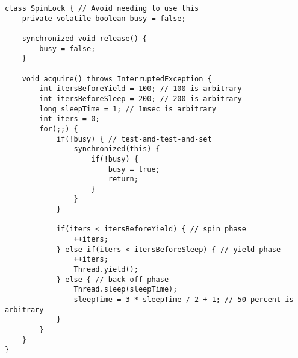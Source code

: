 \begin{verbatim}
class SpinLock { // Avoid needing to use this
    private volatile boolean busy = false;

    synchronized void release() {
        busy = false;
    }

    void acquire() throws InterruptedException {
        int itersBeforeYield = 100; // 100 is arbitrary
        int itersBeforeSleep = 200; // 200 is arbitrary
        long sleepTime = 1; // 1msec is arbitrary
        int iters = 0;
        for(;;) {
            if(!busy) { // test-and-test-and-set
                synchronized(this) {
                    if(!busy) {
                        busy = true;
                        return;
                    }
                }
            }

            if(iters < itersBeforeYield) { // spin phase
                ++iters;
            } else if(iters < itersBeforeSleep) { // yield phase
                ++iters;
                Thread.yield();
            } else { // back-off phase
                Thread.sleep(sleepTime);
                sleepTime = 3 * sleepTime / 2 + 1; // 50 percent is arbitrary
            }
        }
    }
}
\end{verbatim}
